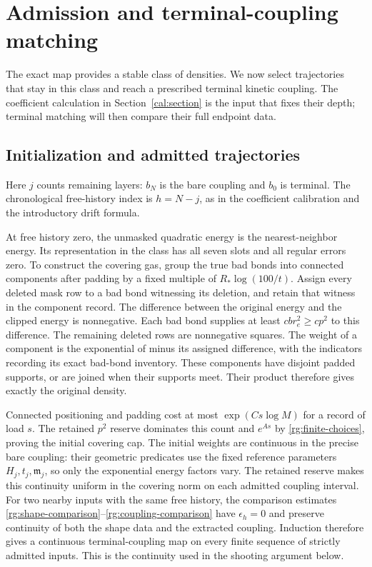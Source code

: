 \section{Admission and terminal-coupling matching}
\label{sec:trajectories}

The exact map provides a stable class of densities. We now select trajectories
that stay in this class and reach a prescribed terminal kinetic coupling.
The coefficient calculation in Section~\ref{cal:section} is the input that
fixes their depth; terminal matching will then compare their full endpoint data.

\subsection{Initialization and admitted trajectories}
\label{rg:trajectories}

Here $j$ counts remaining layers: $b_N$ is the bare coupling and $b_0$
is terminal. The chronological free-history index is $h=N-j$, as in
the coefficient calibration and the introductory drift formula.

At free history zero, the unmasked quadratic energy is the
nearest-neighbor energy.  Its representation in the class has
all seven slots and all regular errors zero.  To construct the
covering gas, group the true bad bonds into connected
components after padding by a fixed multiple of
$R_*\log(100/t)$.  Assign every deleted mask row to a bad bond
witnessing its deletion, and retain that witness in the
component record.  The difference between the original energy
and the clipped energy is nonnegative.  Each bad bond supplies
at least $cb r_e^2\ge cp^2$ to this difference.  The remaining
deleted rows are nonnegative squares.  The weight of a
component is the exponential of minus its assigned difference,
with the indicators recording its exact bad-bond inventory.
These components have disjoint padded supports, or are joined
when their supports meet.  Their product therefore gives
exactly the original density.

Connected positioning and padding cost at most
$\exp(Cs\log M)$ for a record of load $s$.  The retained
$p^2$ reserve dominates this count and $e^{As}$ by
\eqref{rg:finite-choices}, proving the initial covering cap.
The initial weights are continuous in the precise bare coupling:
their geometric predicates use the fixed reference parameters
$H_j,t_j,\mathfrak m_j$, so only the exponential energy factors vary.
The retained reserve makes this continuity uniform in the covering
norm on each admitted coupling interval. For two nearby inputs with
the same free history, the comparison estimates
\eqref{rg:shape-comparison}--\eqref{rg:coupling-comparison} have
$\epsilon_h=0$ and preserve continuity of both the shape data and
the extracted coupling. Induction therefore gives a continuous
terminal-coupling map on every finite sequence of strictly admitted
inputs. This is the continuity used in the shooting argument below.

